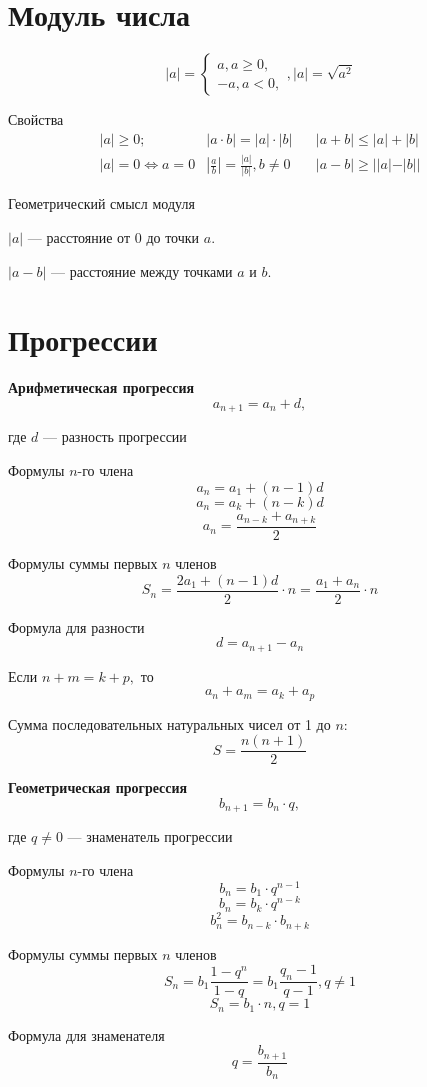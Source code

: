 \documentclass[a5paper, 8pt]{extarticle}
\begin{document}
\section{Модуль числа}

$$|a|=\left\{
\begin{array}{l}
a, a\ge 0,\\
-a, a<0,
\end{array}
\right., 
|a|=\sqrt{a^2}
$$

Свойства
$$ 
\begin{array}{lll}
|a|\ge 0; \ \ \ \ \ & |a\cdot b|=|a|\cdot |b| \ \ \ \ & |a+b|\le |a|+|b|\\
|a|=0 \Leftrightarrow a=0 & \left| \frac{a}{b}\right|=\frac{|a|}{|b|}, b\not=0& |a-b|\ge ||a|-|b|| 
\end{array}
$$

Геометрический смысл модуля

$|a|$ --- расстояние от $0$ до точки $a.$

$|a-b|$ --- расстояние между точками $a$ и $b$.

\section{Прогрессии}

\textbf{Арифметическая прогрессия}
$$
a_{n+1}=a_n+d,$$ 

где $d$ --- разность  прогрессии

Формулы $n$-го члена
$$a_n=a_1+(n-1)d$$
$$a_n=a_k+(n-k)d$$
$$a_n=\frac{a_{n-k}+a_{n+k}}{2}$$

Формулы суммы первых $n$ членов
$$S_n=\frac{2a_1+(n-1)d}{2}\cdot n=\frac{a_1+a_n}{2}\cdot n$$

Формула для разности
$$d=a_{n+1}-a_n$$

Если $n+m=k+p,$ то
$$a_n+a_m=a_k+a_p$$

Сумма последовательных натуральных чисел от  1 до $n:$
$$S=\frac{n(n+1)}{2}$$

\textbf{Геометрическая прогрессия}
$$
b_{n+1}=b_n\cdot q,$$ 

где $q\not= 0$ --- знаменатель  прогрессии

Формулы $n$-го члена
$$b_n=b_1\cdot q^{n-1}$$
$$b_n=b_k\cdot q^{n-k}$$
$$b_n^2=b_{n-k}\cdot b_{n+k}$$

Формулы суммы первых $n$ членов
$$S_n=b_1\frac{1-q^n}{1-q}=b_1\frac{q_n-1}{q-1}, q\not=1$$
$$S_n=b_1\cdot n, q=1$$

Формула для знаменателя
$$q=\frac{b_{n+1}}{b_n}$$
\end{document}
